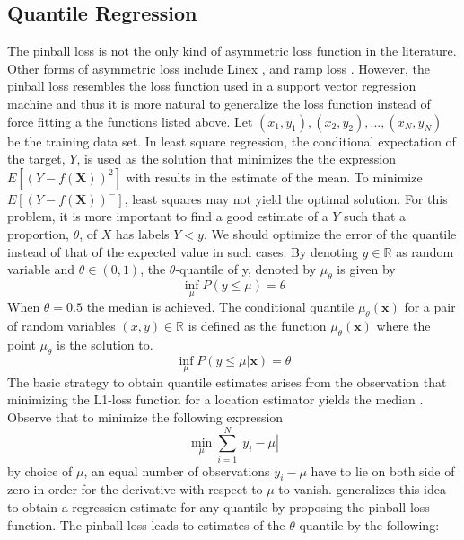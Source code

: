\documentclass[twoside,11pt]{article}
\begin{document}
\subsection{Quantile Regression}
The pinball loss is not the only kind of asymmetric loss function in the literature. Other forms of asymmetric loss include Linex \citep{Demetrescu07} \citep{Ohtani95}, and ramp loss \citep{Takeuchi06}. However, the pinball loss resembles the loss function used in a support vector regression machine and thus it is more natural to generalize the loss function instead of force fitting a the functions listed above. Let $(x_1,y_1),(x_2,y_2),...,(x_N,y_N)$ be the training data set. In least square regression, the conditional expectation of the target, $Y$, is used as the solution that minimizes the the expression $E[(Y-f(\mathbf{X}))^2]$ with results in the estimate of the mean. To minimize $E[(Y-f(\mathbf{X}))^-]$, least squares may not yield the optimal solution. For this problem, it is more important to find a good estimate of a $Y$ such that a proportion, $\theta$, of $X$ has labels $Y<y$. We should optimize the error of the quantile instead of that of the expected value in such cases. By denoting $y \in \mathbb{R}$ as random variable and $\theta \in (0,1)$, the $\theta$-quantile of y, denoted by $\mu_{\theta}$ is given by
 \begin{equation}
 \inf_{\mu}P(y\leq \mu)=\theta
 \end{equation}
When $\theta = 0.5$ the median is achieved. The conditional quantile $\mu_{\theta}(\mathbf{x})$ for a pair of random variables $(x,y) \in \mathbb{R}$ is defined as the function $\mu_{\theta}(\mathbf{x}) $ where the point $\mu_{\theta}$ is the solution to.
 \begin{equation}
 \inf_{\mu}P(y\leq \mu|\mathbf{x})=\theta
 \end{equation}
The basic strategy to obtain quantile estimates arises from the observation that minimizing the L1-loss function for a location estimator yields the median \citep{Hao07}. Observe that to minimize the following expression
\begin{equation}
\min_{\mu}\sum_{i=1}^{N}|y_i-\mu|
 \end{equation}
by choice of $\mu$, an equal number of observations $y_i-\mu$ have to lie on both side of zero in order for the derivative with respect to $\mu$ to vanish. \citet{Koenker01} generalizes this idea to obtain a regression estimate for any quantile by proposing the pinball loss function. The pinball loss leads to estimates of the $\theta$-quantile by the following:
\end{document}
